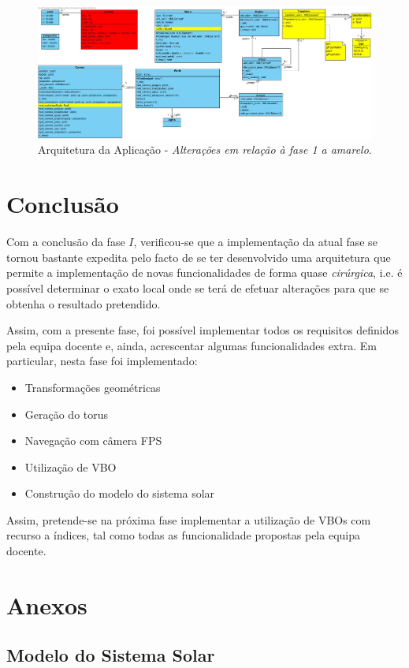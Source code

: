 \documentclass[runningheads]{llncs}
\newenvironment{code}{\captionsetup{type=listing}}{}
\begin{document}
\begin{landscape}
    \begin{figure}
        \centering
        \includegraphics[width=\linewidth]{assets/world.jpg}
        \caption{Arquitetura da Aplicação - \textit{Alterações em relação à fase 1 a amarelo}.}
    \end{figure}
\end{landscape}

\section{Conclusão}
Com a conclusão da fase $I$, verificou-se que a implementação da atual fase 
se tornou bastante expedita pelo facto de se ter desenvolvido
uma arquitetura que permite a implementação de novas funcionalidades 
de forma quase \textit{cirúrgica}, i.e. é possível determinar o exato 
local onde se terá de efetuar alterações para que se obtenha o resultado
pretendido.

Assim, com a presente fase, foi possível implementar todos os requisitos 
definidos pela equipa docente e, ainda, acrescentar algumas funcionalidades extra.
Em particular, nesta fase foi implementado:
\begin{itemize}
    \item Transformações geométricas
    \item Geração do torus
    \item Navegação com câmera FPS
    \item Utilização de VBO
    \item Construção do modelo do sistema solar
\end{itemize}

Assim, pretende-se na próxima fase implementar a utilização de VBOs 
com recurso a índices, tal como todas as funcionalidade propostas pela
equipa docente.

\section*{Anexos}
\subsection*{Modelo do Sistema Solar}
\begin{code}
\label{code:sistema_solar_xml}
\inputminted[linenos, breaklines, frame=lines]{xml}{../../demos/solar_system.xml}
\end{code}


%
%
%
% 
% 
%
\end{document}
